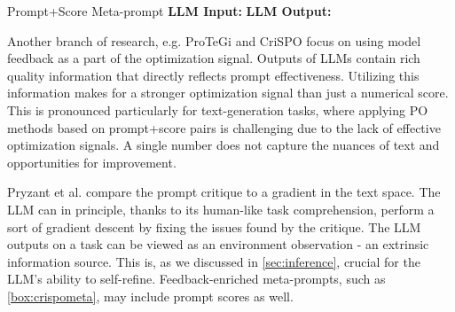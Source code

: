 \begin{promptbox}
    [label={box:oprometa}]{Prompt+Score Meta-prompt}
    \textbf{LLM Input:} 
    \textbf{LLM Output:}
\end{promptbox}


Another branch of research, e.g. ProTeGi\cite{pryzant2023automaticpromptoptimizationgradient} and CriSPO\cite{he2024crispomultiaspectcritiquesuggestionguidedautomatic}
focus on using model feedback as a part of the optimization signal. Outputs of LLMs contain rich quality 
information that directly reflects prompt effectiveness\cite{xiang2025selfsupervisedpromptoptimization}. 
Utilizing this information makes for a stronger optimization signal than just a numerical score.
This is pronounced particularly for text-generation tasks, where applying PO methods based on prompt+score pairs 
is challenging due to the lack of effective optimization signals\cite{he2024crispomultiaspectcritiquesuggestionguidedautomatic}.
A single number does not capture the nuances of text and opportunities for improvement. 

Pryzant et al.\cite{pryzant2023automaticpromptoptimizationgradient}
compare the prompt critique to a gradient in the text space. The LLM can in principle, thanks to its human-like task comprehension\cite{xiang2025selfsupervisedpromptoptimization},
perform a sort of gradient descent by fixing the issues found by the critique. The LLM outputs on a task can be viewed as an environment observation - an extrinsic information source.
This is, as we discussed in \ref{sec:inference}, crucial for the LLM's ability to self-refine. 
Feedback-enriched meta-prompts, such as \ref{box:crispometa}, may include prompt scores as well.

